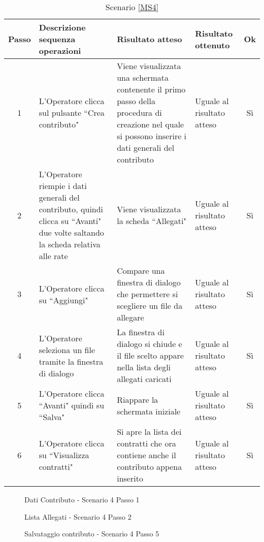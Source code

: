  {
 \footnotesize
  \begin{longtable}{|c|p{3cm}|p{3cm}|p{3cm}|c|}
     \caption{Scenario \ref{MS4}}\\
    \hline
    Passo & Descrizione sequenza operazioni & Risultato atteso & Risultato ottenuto & Ok\\
    \hline
    1 & L'Operatore clicca sul pulsante ``Crea contributo" & Viene visualizzata una schermata contenente il primo passo della procedura di creazione nel quale si possono inserire i dati generali del contributo& Uguale 
      al risultato atteso& Sì\\
    \hline
    2 & L'Operatore riempie i dati generali del contributo, quindi clicca su ``Avanti" due volte saltando la scheda relativa alle rate & Viene visualizzata la scheda ``Allegati" & Uguale al risultato atteso & Sì \\
    \hline
     3 & L'Operatore clicca su ``Aggiungi"& Compare una finestra di dialogo che permettere si scegliere un file da allegare & Uguale al risultato atteso & Sì \\
    \hline
    4 & L'Operatore seleziona un file tramite la finestra di dialogo & La finestra di dialogo si chiude e il file scelto appare nella lista degli allegati caricati & Uguale al risultato atteso & Sì\\
    \hline
    5 & L'Operatore clicca ``Avanti" quindi su ``Salva" & Riappare la schermata iniziale & Uguale al risultato atteso & Sì\\
    \hline
    6 & L'Operatore clicca su ``Visualizza contratti"& Si apre la lista dei contratti che ora contiene anche il contributo appena inserito & Uguale al risultato atteso & Sì\\    
    \hline
\end{longtable}

}

\begin{figure}[h!]
	\centering
	\caption{Dati Contributo - Scenario 4 Passo 1}
	\label{tabDatiContributo}
\end{figure}

\begin{figure}[h!]
	\centering
	\caption{Lista Allegati - Scenario 4 Passo 2}
	\label{allegati}
\end{figure}

\begin{figure}
	\centering
	\caption{Salvataggio contributo - Scenario 4 Passo 5}
	\label{fineContributo}
\end{figure}




